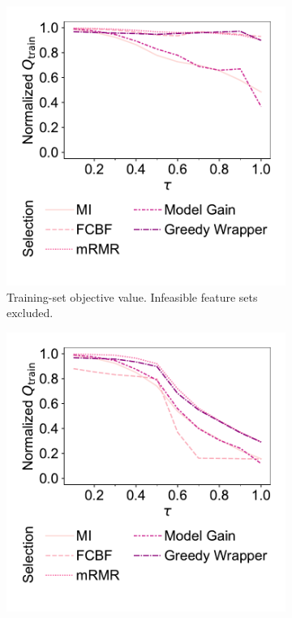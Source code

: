 \documentclass{article}
\theoremstyle{definition}
\begin{document}
\begin{figure}[p]
	\centering
	\begin{subfigure}[t]{0.48\textwidth}
		\centering
		\includegraphics[width=\textwidth, trim=20 35 15 15, clip]{plots/afs-impact-tau-fs-method-train-objective-max.pdf}
		\caption{
			Training-set objective value.
			Infeasible feature sets excluded.
		}
		\label{fig:afs:impact-tau-fs-method-train-objective-max}
	\end{subfigure}
	\hfill
	\begin{subfigure}[t]{0.48\textwidth}
		\centering
		\includegraphics[width=\textwidth, trim=20 35 15 15, clip]{plots/afs-impact-tau-fs-method-train-objective-max-fillna.pdf}

\end{subfigure}
\end{figure}
\end{document}

